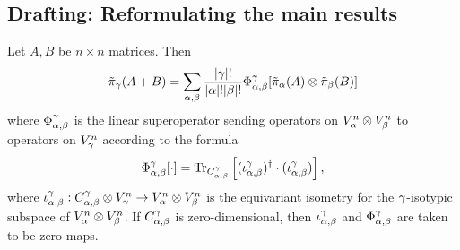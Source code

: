 \documentclass[notitlepage, 10pt]{article}
\begin{document}
\clearpage
\subsection{Drafting: Reformulating the main results}

\begin{thm} 
    Let $A,B$ be $n \times n$ matrices.
    Then
    \begin{equation}
        \tilde \pi_\gamma(A+B) = \sum_{\alpha,\beta} \frac{{|\gamma|}!}{{|\alpha|}!{|\beta|}!} \Phi^{\gamma}_{\alpha,\beta} [\tilde \pi_{\alpha}(A) \otimes \tilde \pi_{\beta}(B)]
    \end{equation}
    where $\Phi^{\gamma}_{\alpha,\beta}$ is the linear superoperator sending operators on $V_{\alpha}^{n} \otimes V_{\beta}^{n}$ to operators on $V_{\gamma}^{n}$ according to the formula
    \begin{equation}
        \Phi^{\gamma}_{\alpha,\beta}[\cdot] = \operatorname{Tr}_{C^{\gamma}_{\alpha,\beta}} \left[ (\iota^{\gamma}_{\alpha,\beta})^{\dagger} \cdot (\iota^{\gamma}_{\alpha,\beta}) \right],
    \end{equation}
    where $\iota^{\gamma}_{\alpha,\beta} : C^{\gamma}_{\alpha,\beta} \otimes V_{\gamma}^{n} \to V_{\alpha}^{n} \otimes V_{\beta}^{n}$ is the equivariant isometry for the $\gamma$-isotypic subspace of $V_{\alpha}^{n} \otimes V_{\beta}^{n}$.
    If $C^{\gamma}_{\alpha,\beta}$ is zero-dimensional, then $\iota^{\gamma}_{\alpha,\beta}$ and $\Phi^{\gamma}_{\alpha,\beta}$ are taken to be zero maps.
\end{thm}
\end{document}

